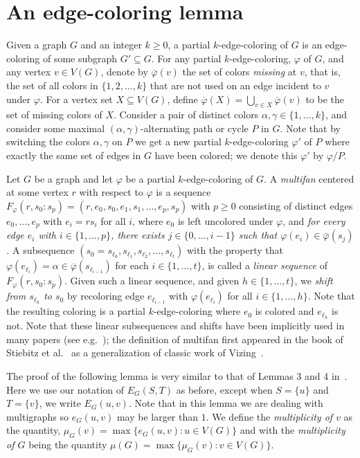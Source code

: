 \documentclass[11pt, oneside]{article}
\newcommand{\pbar}{\overline{\varphi}}
\begin{document}
\section{An edge-coloring lemma}


Given a graph $G$ and an integer $k\ge 0$, a partial $k$-edge-coloring of $G$ is an edge-coloring of some subgraph $G'\subseteq G$. For any partial $k$-edge-coloring, $\varphi$ of $G$, and any vertex $v\in V(G)$, denote by $\pbar(v)$ the set of colors \emph{missing} at $v$, that is, the set of all colors in $\{1, 2, \ldots, k\}$ that are not used on an edge incident to $v$ under $\varphi$. For a vertex set $X\subseteq V(G)$,  define  $\pbar(X)=\bigcup _{v\in X} \pbar(v)$ to be the set of missing colors of $X$. Consider a pair of distinct colors $\alpha, \gamma \in\{1, \ldots, k\}$, and consider some maximal $(\alpha, \gamma)$-alternating path or cycle $P$ in $G$. Note that by switching the colors $\alpha, \gamma$ on $P$ we get a new partial $k$-edge-coloring $\varphi'$ of $P$ where exactly the same set of edges in $G$ have been colored; we denote this $\varphi'$ by $\varphi/P$.

Let $G$ be a graph and let $\varphi$ be a partial $k$-edge-coloring of $G$.  A \emph{multifan} centered at some vertex $r$ with respect to $\varphi$ is a sequence $F_\varphi(r,s_0: s_p)=(r, e_0, s_0, e_1, s_1, \ldots, e_p, s_p)$ with $p\geq 0$ consisting of  distinct edges $e_0, \ldots, e_p$  with $e_i=rs_i$ for all $i$,  where $e_0$ is left uncolored under $\varphi$,   
and \emph{for every edge $e_i$ with $i\in \{1, \ldots, p\}$,  there exists  $j\in \{0, \ldots, i-1\}$ such that 
		$\varphi(e_i)\in \pbar(s_j)$.} 
A subsequence $(s_0=s_{\ell_0}, s_{\ell_1},s_{\ell_2}, \ldots, s_{\ell_t})$ with the property that $\varphi(e_{\ell_i})= \alpha\in \pbar(s_{\ell_{i-1}})$ for each $i\in \{1,\ldots, t\}$, is called a \emph{linear sequence} of $F_\varphi(r,s_0: s_{p})$. 
Given such a linear sequence, and given $h \in \{1, \ldots, t\}$, we \emph{shift from $s_{\ell_h}$ to $s_0$} by recoloring edge $e_{\ell_{i-1}}$ with $\varphi(e_{\ell_{i}})$ for all $i\in\{1, \ldots, h\}$. 
Note that the resulting coloring  is a partial $k$-edge-coloring where $e_0$ is colored and $e_{\ell_h}$ is not. Note that these linear subsequences and shifts have been implicitly used in many papers (see e.g.~\cite{MR4694336}); the definition of multifan first appeared in the book of Stiebitz et al.~\cite{StiebSTF-Book} as a generalization of classic work of Vizing~\cite{Vizing-2-classes}.

The proof of the following lemma is very similar to that of Lemmas 3 and 4  in~\cite{DMS}. Here we use our notation of $E_G(S, T)$ as before, except when $S=\{u\}$ and $T = \{v\}$, we write $E_G(u,v)$. Note that in this lemma we are dealing with multigraphs so $e_G(u,v)$ may be larger than $1$. We define the \emph{multiplicity of $v$} as the quantity, $\mu_G(v) = \max\{e_G(u,v): u\in V(G)\}$ and with the \emph{multiplicity of $G$} being the quantity $\mu(G) = \max\{\mu_G(v): v\in V(G)\}$.
\end{document}
